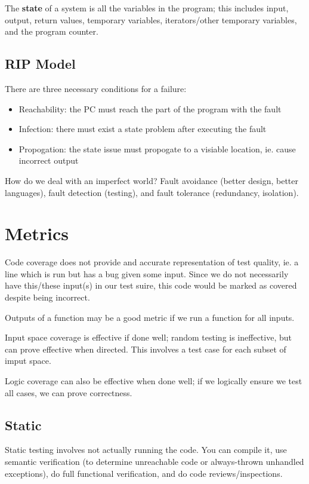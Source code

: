 \documentclass[12pt]{article}
\begin{document}
The {\bf state} of a system is all the variables in the program; this includes input, output, return values, temporary variables, iterators/other temporary variables, and the program counter.

\subsection{RIP Model}
There are three necessary conditions for a failure:
\begin{itemize}
\item Reachability: the PC must reach the part of the program with the fault
\item Infection: there must exist a state problem after executing the fault
\item Propogation: the state issue must propogate to a visiable location, ie. cause incorrect output
\end{itemize}

How do we deal with an imperfect world? Fault avoidance (better design, better languages), fault detection (testing), and fault tolerance (redundancy, isolation).

\section{Metrics}
Code coverage does not provide and accurate representation of test quality, ie. a line which is run but has a bug given some input. Since we do not necessarily have this/these input(s) in our test suire, this code would be marked as covered despite being incorrect.

Outputs of a function may be a good metric if we run a function for all inputs.

Input space coverage is effective if done well; random testing is ineffective, but can prove effective when directed. This involves a test case for each subset of imput space.

Logic coverage can also be effective when done well; if we logically ensure we test all cases, we can prove correctness.

\subsection{Static}
Static testing involves not actually running the code. You can compile it, use semantic verification (to determine unreachable code or always-thrown unhandled exceptions), do full functional verification, and do code reviews/inspections.
\end{document}
